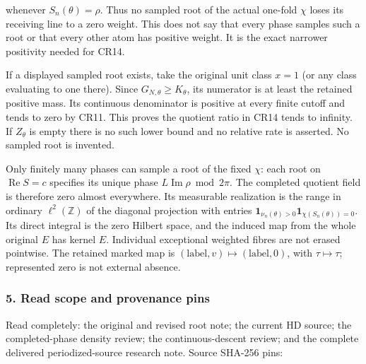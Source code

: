 whenever \(S_n(\theta)=\rho\). Thus no sampled root of the actual one-fold \(\chi\) loses its receiving line to a zero weight. This does not say that every phase samples such a root or that every other atom has positive weight. It is the exact narrower positivity needed for CR14.

If a displayed sampled root exists, take the original unit class \(x=1\) (or any class evaluating to one there). Since \(G_{N,\theta}\ge K_\theta\), its numerator is at least the retained positive mass. Its continuous denominator is positive at every finite cutoff and tends to zero by CR11. This proves the quotient ratio in CR14 tends to infinity. If \(Z_\theta\) is empty there is no such lower bound and no relative rate is asserted. No sampled root is invented.

Only finitely many phases can sample a root of the fixed \(\chi\): each root on \(\operatorname{Re}S=c\) specifies its unique phase \(L\operatorname{Im}\rho\bmod2\pi\). The completed quotient field is therefore zero almost everywhere. Its measurable realization is the range in ordinary \(\ell^2(\mathbb Z)\) of the diagonal projection with entries \(\mathbf1_{\nu_n(\theta)>0}\mathbf1_{\chi(S_n(\theta))=0}\). Its direct integral is the zero Hilbert space, and the induced map from the whole original \(E\) has kernel \(E\). Individual exceptional weighted fibres are not erased pointwise. The retained marked map is \((\mathrm{label},v)\longmapsto(\mathrm{label},0)\), with \(\tau\longmapsto\tau\); represented zero is not external absence.

\subsubsection{5. Read scope and provenance pins}\label{read-scope-and-provenance-pins}

Read completely: the original and revised root note; the current HD source; the completed-phase density review; the continuous-descent review; and the complete delivered periodized-source research note. Source SHA-256 pins:

